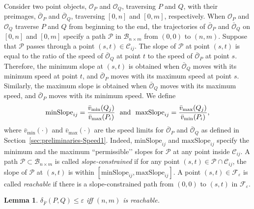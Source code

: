 \documentclass[12pt]{dalthesis}
\newtheorem{lemma}[theorem]{Lemma}
\newcommand{\lee}{\leqslant}
\newcommand{\eps}{\varepsilon}
\newcommand{\CF}{{\mathscr F}}
\newcommand{\CB}{{\mathscr B}}
\newcommand{\CP}{{\mathscr P}}
\newcommand{\CC}{{\mathscr C}}
\newcommand{\distFS}{\delta_{\bar{F}}} \newcommand{\distWeakF}{\delta_{\bar{N}}} \newcommand{\distClosedF}{\delta_{\bar{C}}} \newcommand{\distPartialF}{\delta_{\bar{P}}} \newcommand{\distGrpahF}{\delta_{\bar{G}}} \newcommand{\distDisF}{\delta_{dF}} \newcommand{\distGeoF}{\delta_{\hat{F}}} \newcommand{\distHomF}{\delta_{h}} \newcommand{\distC}{\delta_C} \newcommand{\distSetF}{\delta_{\CF}}
\newcommand{\cell}[1]{{\CC_{#1}}}
\newcommand{\BNM}{\CB_{n \times m}}
\newcommand{\CO}{{\mathscr O}}
\newcommand{\COB}{{\bar{\CO}}}
\newcommand{\Feps}{\CF_\eps}
\newcommand{\Xmin}[2]{{#1}_{\min}(#2)}
\newcommand{\Xmax}[2]{{#1}_{\max}(#2)}
\newcommand{\umin}[1]{\Xmin{\bar{v}}{#1}}
\newcommand{\umax}[1]{\Xmax{\bar{v}}{#1}}
\newcommand{\minS}[1]{\mbox{minSlope}_{#1}}
\newcommand{\maxS}[1]{\mbox{maxSlope}_{#1}}
\begin{document}
Consider two point objects, $\CO_P$ and $\CO_Q$, traversing $P$ and $Q$, with their preimages, $\COB_P$ and $\COB_Q$, traversing $[0,n]$ and $[0,m]$, respectively.
When $\CO_P$ and $\CO_Q$ traverse $P$ and $Q$ from beginning to the end,
the trajectories of $\COB_P$ and $\COB_Q$ on $[0,n]$ and $[0,m]$
specify a path $\CP$ in $\BNM$ from $(0,0)$ to $(n,m)$.
Suppose that $\CP$ passes through a point $(s,t) \in \cell{ij}$.
The slope of $\CP$ at point $(s,t)$ is
equal to the ratio of the speed of $\COB_Q$ at point $t$
to the speed of $\COB_P$ at point $s$.
Therefore, the minimum slope at $(s,t)$ is obtained 
when $\COB_Q$ moves with its minimum speed at point $t$, 
and $\COB_P$ moves with its maximum speed at point $s$.
Similarly, the maximum slope is obtained 
when $\COB_Q$ moves with its maximum speed, 
and $\COB_P$ moves with its minimum speed.
We define 
\[
	\minS{ij} = {\umin{Q_j} \over \umax{P_i}} \ \ \mbox{and} \ \ \maxS{ij} = {\umax{Q_j} \over \umin{P_i}},
\]
where $\umin{\cdot}$ and $\umax{\cdot}$ are the speed limits for $\COB_P$ and $\COB_Q$ as
defined in Section~\ref{sec:preliminaries-Speed1}.
Indeed, $\minS{ij}$ and $\maxS{ij}$ specify
the minimum and the maximum ``permissible\rq{}\rq{} slopes 
for $\CP$ at any point inside $\cell{ij}$.
A path $\CP \subset \BNM$ is called {\em slope-constrained\/}
if for any point $(s,t) \in \CP \cap \cell{ij}$,
the slope of $\CP$ at $(s,t)$ is within $[\minS{ij}, \maxS{ij}]$.
A point $(s,t) \in \Feps$ is called {\em reachable\/} 
if there is a slope-constrained path from $(0,0)$ to $(s,t)$ in $\Feps$.


\begin{lemma} \label{lemma:reachable}
	$\distFS(P,Q) \lee \eps$ iff $(n,m)$ is reachable. 
\end{lemma}
\end{document}

